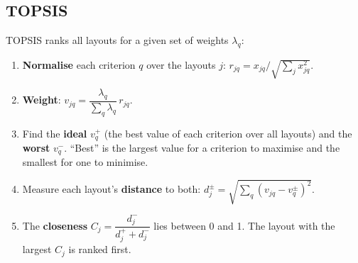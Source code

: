 \documentclass[10pt,a4paper]{article}
\begin{document}
\subsection{TOPSIS}
TOPSIS ranks all layouts for a given set of weights $\lambda_q$:
\begin{enumerate}
\item \textbf{Normalise} each criterion $q$ over the layouts $j$: $r_{jq} = x_{jq} / \sqrt{\sum_j x_{jq}^2}$.
\item \textbf{Weight}: $v_{jq} = \dfrac{\lambda_q}{\sum_q \lambda_q}\, r_{jq}$.
\item Find the \textbf{ideal} $v_q^+$ (the best value of each criterion over all layouts) and the \textbf{worst}
$v_q^-$. ``Best'' is the largest value for a criterion to maximise and the smallest for one to minimise.
\item Measure each layout's \textbf{distance} to both: $d_j^{\pm} = \sqrt{\sum_q (v_{jq} - v_q^{\pm})^2}$.
\item The \textbf{closeness} $C_j = \dfrac{d_j^-}{d_j^+ + d_j^-}$ lies between 0 and 1. The layout with the largest
$C_j$ is ranked first.
\end{enumerate}
\end{document}
